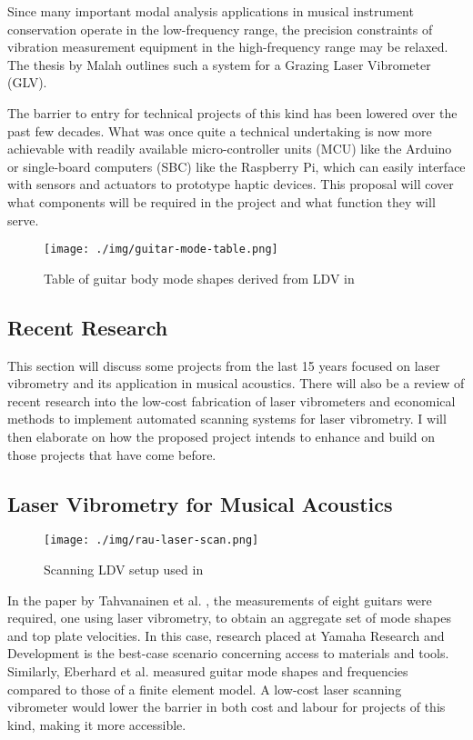 Since many important modal analysis applications in musical instrument conservation operate in the low-frequency range, the precision constraints of vibration measurement equipment in the high-frequency range may be relaxed.  The thesis by Malah \cite{MALAHS2015DESIGNOA} outlines such a system for a Grazing Laser Vibrometer (GLV). 


The barrier to entry for technical projects of this kind has been lowered over the past few decades. What was once quite a technical undertaking is now more achievable with readily available micro-controller units (MCU) like the Arduino or single-board computers (SBC) like the Raspberry Pi, which can easily interface with sensors and actuators to prototype haptic devices. This proposal will cover what components will be required in the project and what function they will serve.

\begin{figure}[h]
\centering
\texttt{[image: ./img/guitar-mode-table.png]}
\caption{Table of guitar body mode shapes derived from LDV in \cite{SKRODZKA}}
\label{fig:guitar-mode-table}
\end{figure}

\hypertarget{recent-research}{%
\subsection{Recent Research}\label{recent-research}}

This section will discuss some projects from the last 15 years focused on laser vibrometry and its application in musical acoustics. There will also be a review of recent research into the low-cost fabrication of laser vibrometers and economical methods to implement automated scanning systems for laser vibrometry. I will then elaborate on how the proposed project intends to enhance and build on those projects that have come before. 

\subsection{Laser Vibrometry for Musical Acoustics}\label{lv-for-music}

\begin{figure}[h]
    \centering
    \texttt{[image: ./img/rau-laser-scan.png]}
    \caption{Scanning LDV setup used in \cite{RAU_THESIS}}
    \label{fig:rau-setup}
\end{figure}

In the paper by Tahvanainen et al. \cite{HENNA}, the measurements of eight
guitars were required, one using laser vibrometry, to obtain an
aggregate set of mode shapes and top plate velocities. In this case, research placed at Yamaha Research and Development is the best-case scenario concerning access to materials and tools.  Similarly, Eberhard et al. \cite{GUITAR_3D_SCAN} measured guitar mode shapes and frequencies compared to those of a finite element model. A low-cost laser scanning vibrometer would lower the barrier in both cost and labour for projects of this kind, making it more accessible.

